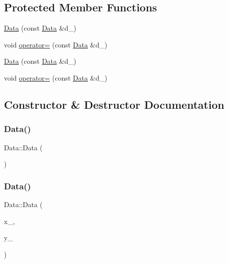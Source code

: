\subsection*{Protected Member Functions}
\begin{DoxyCompactItemize}
\item 
\mbox{\hyperlink{classData_a860bcc89b14c2106e0fc5e33f065fa0f}{Data}} (const \mbox{\hyperlink{classData}{Data}} \&d\+\_\+)
\item 
void \mbox{\hyperlink{classData_a4af8ede7697476321f80686ca5576228}{operator=}} (const \mbox{\hyperlink{classData}{Data}} \&d\+\_\+)
\item 
\mbox{\hyperlink{classData_a860bcc89b14c2106e0fc5e33f065fa0f}{Data}} (const \mbox{\hyperlink{classData}{Data}} \&d\+\_\+)
\item 
void \mbox{\hyperlink{classData_a4af8ede7697476321f80686ca5576228}{operator=}} (const \mbox{\hyperlink{classData}{Data}} \&d\+\_\+)
\end{DoxyCompactItemize}


\subsection{Constructor \& Destructor Documentation}
\mbox{\label{classData_af11f741cb7f587e2e495452a8905a22a}} 
\subsubsection{\texorpdfstring{Data()}{Data()}\hspace{0.1cm}{\footnotesize\ttfamily [1/6]}}
{\footnotesize\ttfamily Data\+::\+Data (\begin{DoxyParamCaption}{ }\end{DoxyParamCaption})\hspace{0.3cm}{\ttfamily [inline]}}

\mbox{\label{classData_a9f1ea96cc98b80ed3778ff5818cb91f8}} 
\subsubsection{\texorpdfstring{Data()}{Data()}\hspace{0.1cm}{\footnotesize\ttfamily [2/6]}}
{\footnotesize\ttfamily Data\+::\+Data (\begin{DoxyParamCaption}\item[{const vector$<$ \mbox{\hyperlink{classAbscissa}{Abscissa}} $\ast$ $>$ \&}]{x\+\_\+,  }\item[{const vector$<$ Ensem\+Real $>$ \&}]{y\+\_\+ }\end{DoxyParamCaption})\hspace{0.3cm}{\ttfamily [inline]}}

